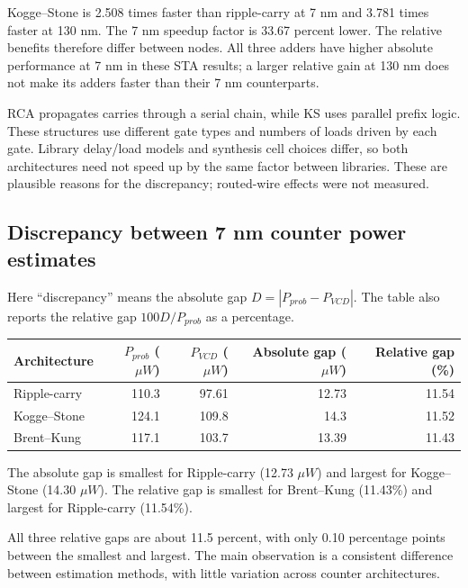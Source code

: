 \documentclass[10pt,letterpaper]{article}
\begin{document}
Kogge--Stone is 2.508 times faster than ripple-carry at 7 nm and 3.781 times faster at 130 nm. The 7 nm speedup factor is 33.67 percent lower. The relative benefits therefore differ between nodes. All three adders have higher absolute performance at 7 nm in
these STA results; a larger relative gain at 130 nm does not make its
adders faster than their 7 nm counterparts.

RCA propagates carries through a serial chain, while KS uses parallel
prefix logic. These structures use different gate types and numbers of
loads driven by each gate. Library delay/load models and synthesis cell
choices differ, so both architectures need not speed up by the same factor
between libraries. These are plausible reasons for the discrepancy;
routed-wire effects were not measured.

\subsection{Discrepancy between 7 nm counter power estimates}
Here ``discrepancy'' means the absolute gap
$D=|P_{prob}-P_{VCD}|$. The table also reports the relative gap
$100D/P_{prob}$ as a percentage.


\begin{center}\small
\begin{tabular}{lrrrr}
\toprule
Architecture & $P_{prob}$ ($\mu W$) & $P_{VCD}$ ($\mu W$) & Absolute gap ($\mu W$) & Relative gap (\%) \\
\midrule
Ripple-carry & 110.3 & 97.61 & 12.73 & 11.54 \\
Kogge--Stone & 124.1 & 109.8 & 14.3 & 11.52 \\
Brent--Kung & 117.1 & 103.7 & 13.39 & 11.43 \\
\bottomrule
\end{tabular}
\end{center}

The absolute gap is smallest for Ripple-carry (12.73 $\mu W$) and largest for Kogge--Stone (14.30 $\mu W$). The relative gap is smallest for Brent--Kung (11.43\%) and largest for Ripple-carry (11.54\%).

All three relative gaps are about 11.5 percent, with only 0.10 percentage points between the smallest and largest. The main observation is a consistent difference between estimation methods, with little variation across counter architectures.
\end{document}
